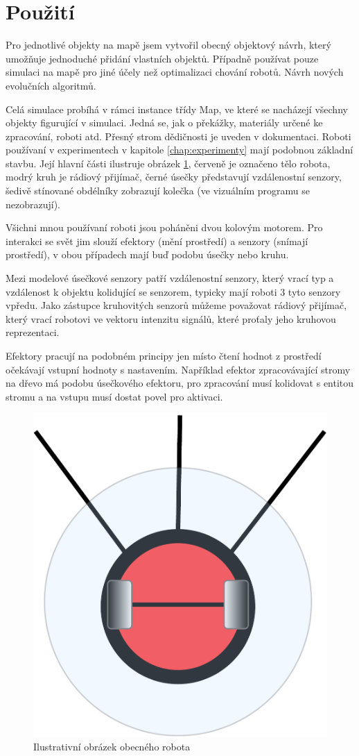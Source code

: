 \section*{Použití}
Pro jednotlivé objekty na mapě jsem vytvořil obecný objektový návrh, který umožňuje jednoduché přidání vlastních objektů. Případně používat pouze simulaci na mapě pro jiné účely než optimalizaci chování robotů. Návrh nových evolučních algoritmů.
\par
Celá simulace probíhá v rámci instance třídy Map, ve které se nacházejí všechny objekty figurující v simulaci. Jedná se, jak o překážky, materiály určené ke zpracování, roboti atd. Přesný strom dědičnosti je uveden v dokumentaci. Roboti používaní v experimentech v kapitole \ref{chap:experimenty} mají podobnou základní stavbu. Její hlavní části ilustruje obrázek \ref{obr03:robotModel}, červeně je označeno tělo robota, modrý kruh je rádiový přijímač, černé úsečky představují vzdálenostní senzory, šedivě stínované obdélníky zobrazují kolečka (ve vizuálním programu se nezobrazují).
\par 
Všichni mnou používaní roboti jsou poháněni dvou kolovým motorem. Pro interakci se svět jim slouží efektory (mění prostředí) a senzory (snímají prostředí), v obou případech mají buď podobu úsečky nebo kruhu.
\par
 Mezi modelové úsečkové senzory patří vzdálenostní senzory, který vrací typ a vzdálenost k objektu kolidující se senzorem, typicky mají roboti 3 tyto senzory vpředu. Jako zástupce kruhovitých senzorů můžeme považovat rádiový přijímač, který vrací robotovi ve vektoru intenzitu signálů, které proťaly jeho kruhovou reprezentaci.
 \par 
 Efektory pracují na podobném principy jen místo čtení hodnot z prostředí očekávají vstupní hodnoty s nastavením. Například efektor zpracovávající stromy na dřevo má podobu úsečkového efektoru, pro zpracování musí kolidovat s entitou stromu a na vstupu musí dostat povel pro aktivaci. 
 \par
 \begin{figure}[h]\centering
	\includegraphics[scale=0.5]{../img/RobotModel}
	\caption{Ilustrativní obrázek obecného robota}
	\label{obr03:robotModel}
\end{figure}
